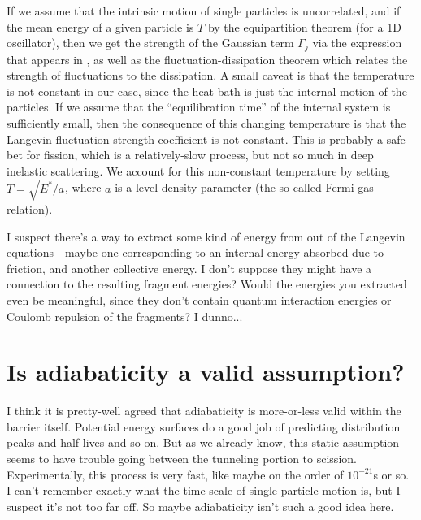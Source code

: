 If we assume that the intrinsic motion of single particles is uncorrelated, and if the mean energy of a given particle is $T$ by the equipartition theorem (for a 1D oscillator), then we get the strength of the Gaussian term $\Gamma_j$ via the expression that appears in \cite{Sadhukhan2016}, as well as the fluctuation-dissipation theorem which relates the strength of fluctuations to the dissipation. A small caveat is that the temperature is not constant in our case, since the heat bath is just the internal motion of the particles. If we assume that the ``equilibration time'' of the internal system is sufficiently small, then the consequence of this changing temperature is that the Langevin fluctuation strength coefficient is not constant. This is probably a safe bet for fission, which is a relatively-slow process, but not so much in deep inelastic scattering. We account for this non-constant temperature by setting $T=\sqrt{E^*/a}$, where $a$ is a level density parameter (the so-called Fermi gas relation).

I suspect there's a way to extract some kind of energy from out of the Langevin equations - maybe one corresponding to an internal energy absorbed due to friction, and another collective energy. I don't suppose they might have a connection to the resulting fragment energies? Would the energies you extracted even be meaningful, since they don't contain quantum interaction energies or Coulomb repulsion of the fragments? I dunno...

\section{Is adiabaticity a valid assumption?}
I think it is pretty-well agreed that adiabaticity is more-or-less valid within the barrier itself. Potential energy surfaces do a good job of predicting distribution peaks and half-lives and so on. But as we already know, this static assumption seems to have trouble going between the tunneling portion to scission. Experimentally, this process is very fast, like maybe on the order of $10^{-21}$s or so. I can't remember exactly what the time scale of single particle motion is, but I suspect it's not too far off. So maybe adiabaticity isn't such a good idea here.

